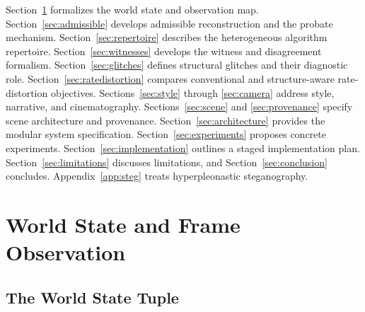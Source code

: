 \documentclass[12pt,a4paper]{article}
\theoremstyle{plain}
\theoremstyle{definition}
\theoremstyle{remark}
\begin{document}
Section~\ref{sec:worldstate} formalizes the world state and observation map. Section~\ref{sec:admissible} develops admissible reconstruction and the probate mechanism. Section~\ref{sec:repertoire} describes the heterogeneous algorithm repertoire. Section~\ref{sec:witnesses} develops the witness and disagreement formalism. Section~\ref{sec:glitches} defines structural glitches and their diagnostic role. Section~\ref{sec:ratedistortion} compares conventional and structure-aware rate-distortion objectives. Sections~\ref{sec:style} through \ref{sec:camera} address style, narrative, and cinematography. Sections~\ref{sec:scene} and \ref{sec:provenance} specify scene architecture and provenance. Section~\ref{sec:architecture} provides the modular system specification. Section~\ref{sec:experiments} proposes concrete experiments. Section~\ref{sec:implementation} outlines a staged implementation plan. Section~\ref{sec:limitations} discusses limitations, and Section~\ref{sec:conclusion} concludes. Appendix~\ref{app:steg} treats hyperpleonastic steganography.

\section{World State and Frame Observation}
\label{sec:worldstate}

\subsection{The World State Tuple}
\end{document}
